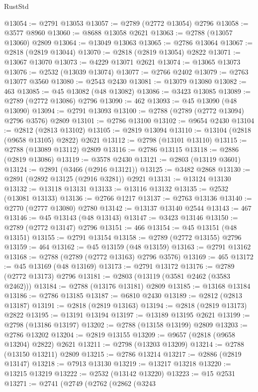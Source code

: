 \begin{lexlean}{RustStd}
\begin{coremodule}
@13054 := @2791 @13053
@13057 := @2789 (@2772 @13054) @2796
@13058 := @3577 @8960
@13060 := @8688 @13058 @2621
@13063 := @2788 (@13057 @13060) @2809
@13064 := @13049 @13063
@13065 := @2786 @13064
@13067 := @2818 (@2819 @13044)
@13070 := @2818 (@2819 @13054) @2822
@13071 := @13067 @13070
@13073 := @4229 @13071 @2621
@13074 := @13065 @13073
@13076 := @2532 (@13039 @13074)
@13077 := @2766 @2402
@13079 := @2763 @13077 @3560
@13080 := @2543 @2430
@13081 := @13079 @13080
@13082 := 463
@13085 := @45 @13082 (@48 @13082)
@13086 := @3423 @13085
@13089 := @2789 (@2772 @13086) @2796
@13090 := 462
@13093 := @45 @13090 (@48 @13090)
@13094 := @2791 @13093
@13100 := @2788 (@2789 (@2772 @13094) @2796 @3576) @2809
@13101 := @2786 @13100
@13102 := @9654 @2430
@13104 := @2812 (@2813 @13102)
@13105 := @2819 @13094
@13110 := @13104 (@2818 (@9658 @13105) @2822) @2621
@13112 := @2798 (@13101 @13110)
@13115 := @2788 (@13089 @13112) @2809
@13116 := @2786 @13115
@13118 := @2886 (@2819 @13086)
@13119 := @3578 @2430
@13121 := @2803 (@13119 @3601)
@13124 := @2891 (@3466 (@2916 @13121))
@13125 := @3482 @2868
@13130 := @2891 (@2892 @13125 (@2916 @3281)) @2921
@13131 := @13124 @13130
@13132 := @13118 @13131
@13133 := @13116 @13132
@13135 := @2532 (@13081 @13133)
@13136 := @2766 @1217
@13137 := @2763 @13136
@13140 := @2770 (@2777 @13080) @2780
@13142 := @13137 @13140 @2544
@13143 := 467
@13146 := @45 @13143 (@48 @13143)
@13147 := @3423 @13146
@13150 := @2789 (@2772 @13147) @2796
@13151 := 466
@13154 := @45 @13151 (@48 @13151)
@13155 := @2791 @13154
@13158 := @2789 (@2772 @13155) @2796
@13159 := 464
@13162 := @45 @13159 (@48 @13159)
@13163 := @2791 @13162
@13168 := @2788 (@2789 (@2772 @13163) @2796 @3576)
@13169 := 465
@13172 := @45 @13169 (@48 @13169)
@13173 := @2791 @13172
@13176 := @2789 (@2772 @13173) @2796
@13181 := @2803 (@13119 (@3581 @2462 (@3583 @2462)))
@13184 := @2788 (@13176 @13181) @2809
@13185 := @13168 @13184
@13186 := @2786 @13185
@13187 := @6810 @2430
@13189 := @2812 (@2813 @13187)
@13191 := @2818 (@2819 @13163)
@13194 := @2818 (@2819 @13173) @2822
@13195 := @13191 @13194
@13197 := @13189 @13195 @2621
@13199 := @2798 (@13186 @13197)
@13202 := @2788 (@13158 @13199) @2809
@13203 := @2786 @13202
@13204 := @2819 @13155
@13209 := @9657 (@2818 (@9658 @13204) @2822) @2621
@13211 := @2798 (@13203 @13209)
@13214 := @2788 (@13150 @13211) @2809
@13215 := @2786 @13214
@13217 := @2886 (@2819 @13147)
@13218 := @7913 @13130
@13219 := @13217 @13218
@13220 := @13215 @13219
@13222 := @2532 (@13142 @13220)
@13223 := @15 @2531
@13271 := @2741
    (@2749
      (@2762
        (@2862
          (@3243

\end{coremodule}
\end{lexlean}
